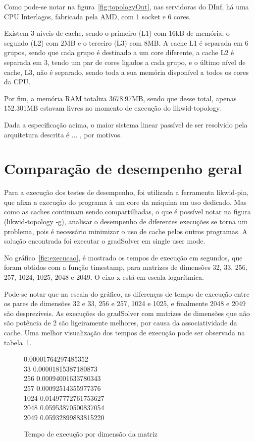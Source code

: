 \documentclass[12pt]{article}
\begin{document}
Como pode-se notar na figura~\ref{fig:topologyOut}, nas servidoras do DInf, há
uma CPU Interlagos, fabricada pela AMD, com 1 socket e 6 cores.

Existem 3 níveis de cache, sendo o primeiro (L1) com 16kB de memória, o segundo
(L2) com 2MB e o terceiro (L3) com 8MB. A cache L1 é separada em 6 grupos, sendo
que cada grupo é destinado a um core diferente, a cache L2 é separada em 3,
tendo um par de cores ligados a cada grupo, e o último nível de cache, L3, não é
separado, sendo toda a sua memória disponível a todos os cores da CPU.

Por fim, a memória RAM totaliza 3678.97MB, sendo que desse total, apenas
152.301MB estavam livres no momento de execução do likwid-topology.

Dada a especificação acima, o maior sistema linear passível de ser resolvido
pela arquitetura descrita é ... , por motivos.

\section{Comparação de desempenho geral}\label{sec:desempenhoGeral}

Para a execução dos testes de desempenho, foi utilizada a ferramenta likwid-pin,
que afixa a execução do programa à um core da máquina em uso dedicado. Mas como
as caches continuam sendo compartilhadas, o que é possível notar na figura
(likwid-topology -g), analisar o desempenho de diferentes execuções se torna um
problema, pois é necessário minimizar o uso de cache pelos outros programas. A
solução encontrada foi executar o gradSolver em single user mode.

No gráfico~\ref{fig:execucao}, é mostrado os tempos de execução em segundos, que
foram obtidos com a função timestamp, para matrizes de dimensões 32, 33, 256,
257, 1024, 1025, 2048 e 2049. O eixo x está em escala logarítmica.

Pode-se notar que na escala do gráfico, as diferenças de tempo de execução entre
os pares de dimensões 32 e 33, 256 e 257, 1024 e 1025, e finalmente 2048 e 2049
são desprezíveis. As execuções do gradSolver com matrizes de dimensões que não
são potência de 2 são ligeiramente melhores, por causa da associatividade da
cache. Uma melhor visualização dos tempos de execução pode ser observada na
tabela~\ref{fig:tabelaExecucoes}.

\begin{figure}[htb]
\begin{tt}      0.00001764297485352\\
    33      0.00001815387180873\\
    256     0.00094001633780343\\
    257     0.00092514355977376\\
    1024    0.01497772761753627\\
    2048    0.05953870500837054\\
    2049    0.05932899883815220\\
\end{tt}\caption{Tempo de execução por dimensão da matriz}\label{fig:tabelaExecucoes}
\end{figure}
\end{document}
